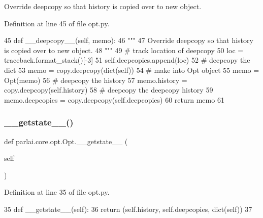 \begin{DoxyVerb}Override deepcopy so that history is copied over to new object.
\end{DoxyVerb}
 

Definition at line 45 of file opt.\+py.


\begin{DoxyCode}
45     \textcolor{keyword}{def }\_\_deepcopy\_\_(self, memo):
46         \textcolor{stringliteral}{"""}
47 \textcolor{stringliteral}{        Override deepcopy so that history is copied over to new object.}
48 \textcolor{stringliteral}{        """}
49         \textcolor{comment}{# track location of deepcopy}
50         loc = traceback.format\_stack()[-3]
51         self.deepcopies.append(loc)
52         \textcolor{comment}{# deepcopy the dict}
53         memo = copy.deepcopy(dict(self))
54         \textcolor{comment}{# make into Opt object}
55         memo = Opt(memo)
56         \textcolor{comment}{# deepcopy the history}
57         memo.history = copy.deepcopy(self.history)
58         \textcolor{comment}{# deepcopy the deepcopy history}
59         memo.deepcopies = copy.deepcopy(self.deepcopies)
60         \textcolor{keywordflow}{return} memo
61 
\end{DoxyCode}
\mbox{\label{classparlai_1_1core_1_1opt_1_1Opt_a854ab6c12dd27aa832b2692ff0867eb7}} 
\subsubsection{\texorpdfstring{\+\_\+\+\_\+getstate\+\_\+\+\_\+()}{\_\_getstate\_\_()}}
{\footnotesize\ttfamily def parlai.\+core.\+opt.\+Opt.\+\_\+\+\_\+getstate\+\_\+\+\_\+ (\begin{DoxyParamCaption}\item[{}]{self }\end{DoxyParamCaption})}



Definition at line 35 of file opt.\+py.


\begin{DoxyCode}
35     \textcolor{keyword}{def }\_\_getstate\_\_(self):
36         \textcolor{keywordflow}{return} (self.history, self.deepcopies, dict(self))
37 
\end{DoxyCode}
\mbox{\label{classparlai_1_1core_1_1opt_1_1Opt_a1d3fd7bb0ebe614e26c70213261dfd07}} 
